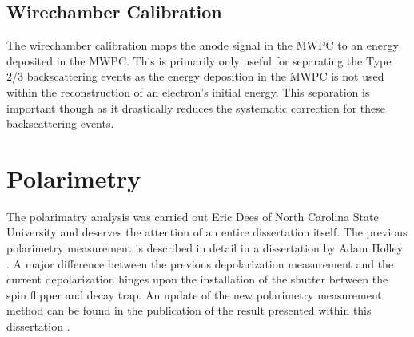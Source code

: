 \subsection{Wirechamber Calibration}

The wirechamber calibration maps the anode signal in the MWPC to an energy deposited in the MWPC. This is
primarily only useful for separating the Type 2/3 backscattering events as the
energy deposition in the MWPC is not used within the reconstruction of an electron's initial
energy. This separation is important though as it drastically reduces the systematic
correction for these backscattering events.
 

\section{Polarimetry} \label{sec:polarimetry}

The polarimatry analysis was carried out Eric Dees of North Carolina State University and
deserves the attention of an entire dissertation itself. The previous polarimetry measurement
is described in detail in a dissertation by Adam Holley \cite{holley2012ultracold}. A major
difference between the previous depolarization measurement and the current depolarization
hinges upon the installation of the shutter between the spin flipper and decay trap. An
update of the new polarimetry measurement method can be found in the publication of the result
presented within this dissertation \cite{brown2017}.

